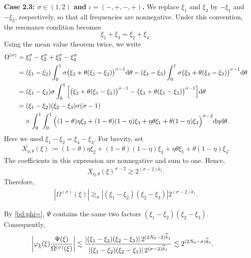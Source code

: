 \documentclass[UTF-8,reqno]{amsart}
\numberwithin{equation}{section}
\theoremstyle{definition}
\def\dif{{\mathord{{\rm d}}}}
\def\dif{{\mathord{{\rm d}}}}
\begin{document}
\textbf{Case 2.3: $\sigma\in(1,2)$ and
$\iota=(-,+,-,+)$.}
We replace $\xi_1$ and $\xi_3$ by $-\xi_1$ and $-\xi_3$,
respectively, so that all frequencies are nonnegative.
Under this convention, the resonance condition becomes
\[
    \xi_1+\xi_3=\xi_2+\xi_4.
\]
Using the mean value theorem twice, we write
\begin{align}
\Omega^{(\sigma)}
&=\xi_1^\sigma-\xi_2^\sigma+\xi_3^\sigma-\xi_4^\sigma
\notag\\
&=(\xi_1-\xi_2)
  \int_0^1
  \sigma\bigl(\xi_2+\theta(\xi_1-\xi_2)\bigr)^{\sigma-1}
  \dif\theta 
-(\xi_4-\xi_3)
  \int_0^1
  \sigma\bigl(\xi_3+\theta(\xi_4-\xi_3)\bigr)^{\sigma-1}
  \dif\theta
\notag\\
&=(\xi_1-\xi_2)\sigma
  \int_0^1
  \Big[
      \bigl(\xi_2+\theta(\xi_1-\xi_2)\bigr)^{\sigma-1}
 -
      \bigl(\xi_3+\theta(\xi_1-\xi_2)\bigr)^{\sigma-1}
  \Big]
  \dif\theta
\notag\\
&=(\xi_1-\xi_2)(\xi_2-\xi_3)\sigma(\sigma-1)
\notag\\
&\quad\times
\int_0^1\int_0^1
\Big(
    (1-\theta)\eta\xi_2
    +(1-\theta)(1-\eta)\xi_3
    +\eta\theta\xi_1
    +\theta(1-\eta)\xi_4
\Big)^{\sigma-2}
\dif\eta\dif\theta.
\label{bd:omega2.3}
\end{align}
Here we used $ \xi_1-\xi_2=\xi_4-\xi_3.$ 
For brevity, set
\begin{align*}
X_{\eta,\theta}(\xi)
:=
(1-\theta)\eta\xi_2
+(1-\theta)(1-\eta)\xi_3
+\eta\theta\xi_1
+\theta(1-\eta)\xi_4.
\end{align*}
The coefficients in this expression are nonnegative and sum to one.
Hence, 
\[
    X_{\eta,\theta}(\xi)^{\sigma-2}
    \gtrsim
    2^{(\sigma-2)\widetilde k_1}.
\]
Therefore,
\begin{align}
\left|\Omega^{(\sigma)}(\xi)\right|
\gtrsim_\sigma
\left|
(\xi_1-\xi_2)(\xi_2-\xi_3)
\right|
2^{(\sigma-2)\widetilde k_1}.
\label{eq:omega-lower-case23}
\end{align}

By \eqref{bd:phi=}, $\Psi$ contains the same two factors
$(\xi_1-\xi_2)(\xi_2-\xi_3)$. Consequently,  
\begin{align}
\left|
\varphi_{\underline{k}}(\xi)
\frac{\Psi(\xi)}{\Omega^{(\sigma)}(\xi)}
\right|
&\lesssim
\frac{
\left|
(\xi_1-\xi_2)(\xi_2-\xi_3)
\right|
2^{(2N_0-2)\widetilde{k}_1}
}{
\left|
(\xi_1-\xi_2)(\xi_2-\xi_3)
\right|
2^{(\sigma-2)\widetilde{k}_1}
} \lesssim
2^{(2N_0-\sigma)\widetilde{k}_1}.\notag
\end{align}
\end{document}
